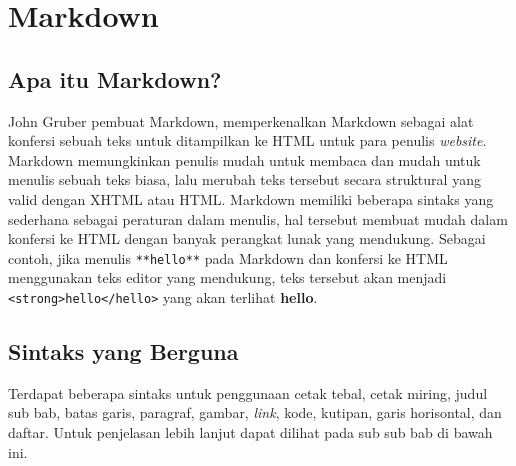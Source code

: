 \section{Markdown}
\label{sec:markdown}

\subsection{Apa itu Markdown? \cite{Markguide:2015}}
John Gruber pembuat Markdown, memperkenalkan Markdown sebagai alat konfersi sebuah teks untuk ditampilkan ke HTML untuk para penulis {\it website}. Markdown memungkinkan penulis mudah untuk membaca dan mudah untuk menulis sebuah teks biasa, lalu merubah teks tersebut secara struktural yang valid dengan XHTML atau HTML. Markdown memiliki beberapa sintaks yang sederhana sebagai peraturan dalam menulis, hal tersebut membuat mudah dalam konfersi ke HTML dengan banyak perangkat lunak yang mendukung. Sebagai contoh, jika menulis \verb+**hello**+ pada Markdown dan konfersi ke HTML menggunakan teks editor yang mendukung, teks tersebut akan menjadi \verb+<strong>hello</hello>+ yang akan terlihat \textbf{hello}. 

\subsection{Sintaks yang Berguna \cite{Markguide:2015}}
Terdapat beberapa sintaks untuk penggunaan cetak tebal, cetak miring, judul sub bab, batas garis, paragraf, gambar, {\it link}, kode, kutipan, garis horisontal, dan daftar. Untuk penjelasan lebih lanjut dapat dilihat pada sub sub bab di bawah ini.

